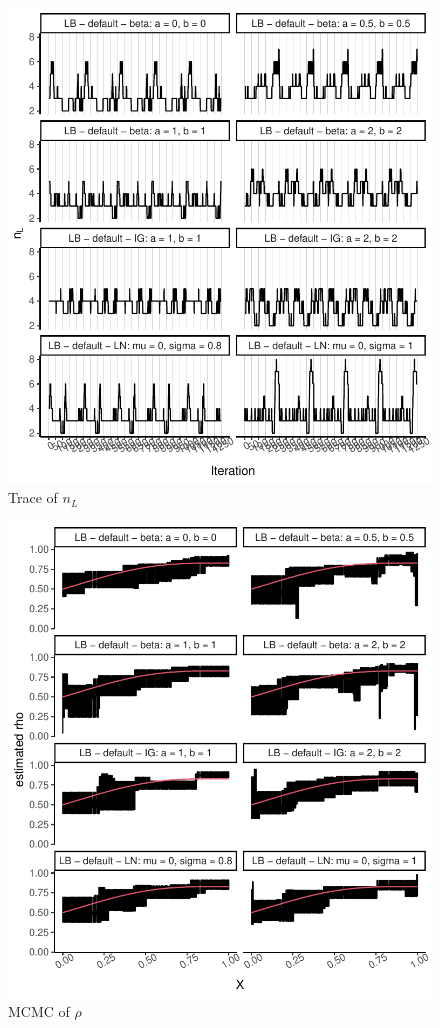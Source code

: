 \documentclass{amsart}
\begin{document}
\begin{figure}[ht]
	\centering
	\includegraphics[width=0.95\linewidth]{trace_nl_2.pdf}
	\caption{Trace of $n_L$}
	\label{fig:trace:nl:2}
\end{figure}

\begin{figure}[ht]
	\centering
	\includegraphics[width=0.95\linewidth]{mcmc_rho_2.pdf}
	\caption{MCMC of $\rho$}
	\label{fig:mcmc:rho:2}
\end{figure}
\end{document}
